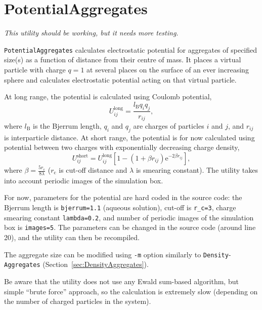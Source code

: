 \section{PotentialAggregates} \label{sec:PotentialAggregates}

{\em This utility should be working, but it needs more testing.}

\texttt{PotentialAggregates} calculates electrostatic potential for
aggregates of specified size(s) as a function of distance from their centre
of mass.  It places a virtual particle with charge $q=1$ at several places
on the surface of an ever increasing sphere and calculates electrostatic
potential acting on that virtual particle.

At long range, the potential is calculated using Coulomb potential,
\begin{equation} \label{eq:Coulomb}
  U_{ij}^{\mathrm{long}} = \frac{l_{\mathrm{B}} q_i q_j}{r_{ij}},
\end{equation}
where $l_{\mathrm{B}}$ is the Bjerrum length, $q_i$ and $q_j$ are charges
of particles $i$ and $j$, and $r_{ij}$ is interparticle distance. At short
range, the potential is for now calculated using potential between two
charges with exponentially decreasing charge density,
\begin{equation} \label{eq:Slater}
  U_{ij}^{\mathrm{short}} = U_{ij}^{\mathrm{long}}\left[1 - \left(1 + \beta
  r_{ij}\right) \mathrm{e}^{-2\beta r_{ij}}\right],
\end{equation}
where $\beta=\frac{5r_{\mathrm{c}}}{8\lambda}$ ($r_{\mathrm{c}}$ is cut-off
distance and $\lambda$ is smearing constant). The utility takes into
account periodic images of the simulation box.

For now, parameters for the potential are hard coded in the source code:
the Bjerrum length is \texttt{bjerrum=1.1} (aqueous solution), cut-off is
\texttt{r\_c=3}, charge smearing constant \texttt{lambda=0.2}, and number
of periodic images of the simulation box is \texttt{images=5}. The
parameters can be changed in the source code (around line 20), and the
utility can then be recompiled.

The aggregate size can be modified using \texttt{-m} option similarly to
\texttt{Density}-\texttt{Aggregates} (Section~\ref{sec:DensityAggregates}).

Be aware that the utility does not use any Ewald sum-based algorithm, but
simple \enquote{brute force} approach, so the calculation is extremely slow
(depending on the number of charged particles in the system).

